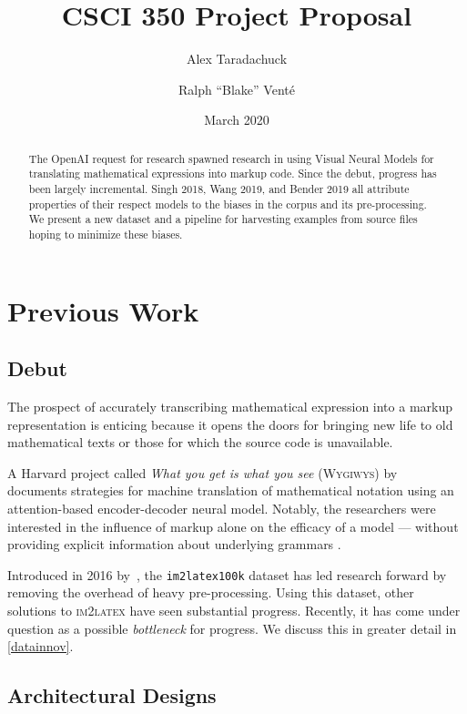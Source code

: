 \documentclass{article}
\title{\TeXNet{} \textbar{} CSCI 350 Project Proposal}
\author{Alex Taradachuck \and Ralph ``Blake'' Vent\'{e}}
\date{March 2020}
\begin{document}
\maketitle

\begin{abstract}
  The OpenAI request for research spawned research in using Visual Neural Models
  for translating mathematical expressions into markup code. Since the debut,
  progress has been largely incremental. Singh 2018, Wang 2019, and Bender 2019
  all attribute properties of their respect models to the biases in the corpus
  and its pre-processing. We present a new dataset and a pipeline for harvesting
  examples from source files hoping to minimize these biases.
\end{abstract}

\section{Previous Work}

\subsection{Debut}

The prospect of accurately transcribing mathematical expression into a markup
representation is enticing because it opens the doors for bringing new life to
old mathematical texts or those for which the source code is unavailable.

A Harvard project called \emph{What you get is what you see} (\textsc{Wygiwys})
by~\cite{deng2016you} documents strategies for machine translation of
mathematical notation using an attention-based encoder-decoder neural model.
Notably, the researchers were interested in the influence of markup alone on the
efficacy of a model --- without providing explicit information about underlying
grammars \parencite[1]{deng2016you}.

Introduced in 2016 by~\cite{deng2016you}, the \texttt{im2latex100k} dataset has
led research forward by removing the overhead of heavy pre-processing. Using
this dataset, other solutions to \textsc{im2latex} have seen substantial
progress. Recently, it has come under question as a possible \textit{bottleneck} for
progress. We discuss this in greater detail in \ref{datainnov}.

\subsection{Architectural Designs}
\end{document}
